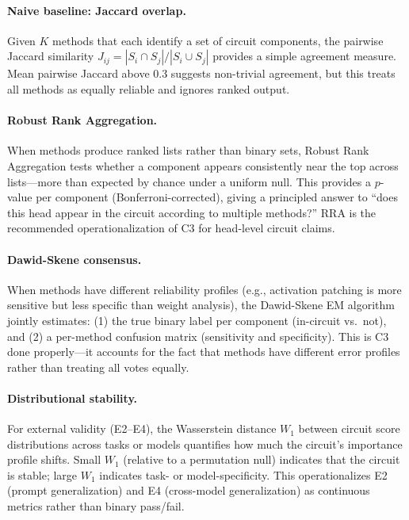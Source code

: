 \documentclass[10pt]{article}
\begin{document}
\paragraph{Naive baseline: Jaccard overlap.} Given $K$ methods that each identify a set of circuit components, the pairwise Jaccard similarity $J_{ij} = |S_i \cap S_j| / |S_i \cup S_j|$ provides a simple agreement measure. Mean pairwise Jaccard above 0.3 suggests non-trivial agreement, but this treats all methods as equally reliable and ignores ranked output.

\paragraph{Robust Rank Aggregation.} When methods produce ranked lists rather than binary sets, Robust Rank Aggregation \citep{kolde2012robust} tests whether a component appears consistently near the top across lists---more than expected by chance under a uniform null. This provides a $p$-value per component (Bonferroni-corrected), giving a principled answer to ``does this head appear in the circuit according to multiple methods?'' RRA is the recommended operationalization of C3 for head-level circuit claims.

\paragraph{Dawid-Skene consensus.} When methods have different reliability profiles (e.g., activation patching is more sensitive but less specific than weight analysis), the Dawid-Skene EM algorithm \citep{dawid1979maximum} jointly estimates: (1) the true binary label per component (in-circuit vs.\ not), and (2) a per-method confusion matrix (sensitivity and specificity). This is C3 done properly---it accounts for the fact that methods have different error profiles rather than treating all votes equally.

\paragraph{Distributional stability.} For external validity (E2--E4), the Wasserstein distance $W_1$ between circuit score distributions across tasks or models quantifies how much the circuit's importance profile shifts. Small $W_1$ (relative to a permutation null) indicates that the circuit is stable; large $W_1$ indicates task- or model-specificity. This operationalizes E2 (prompt generalization) and E4 (cross-model generalization) as continuous metrics rather than binary pass/fail.
\end{document}
